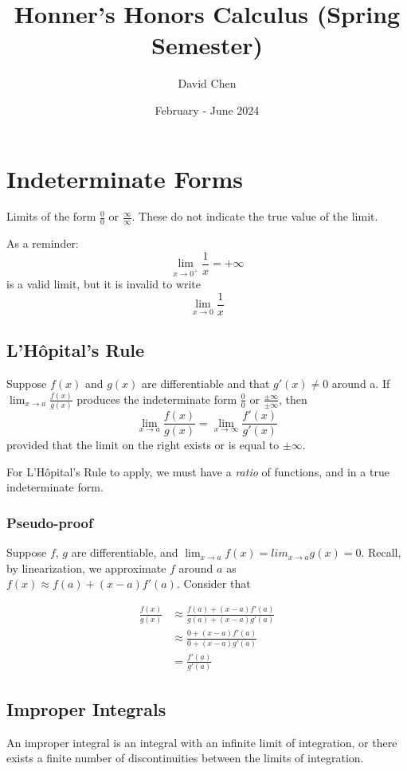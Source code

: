 \documentclass{article}
\title{Honner's Honors Calculus (Spring Semester)}
\author{David Chen}
\date{February - June 2024}
\begin{document}
\maketitle

\section{Indeterminate Forms}
Limits of the form $\frac{0}{0}$ or $\frac{\infty}{\infty}$. These do not indicate the true value of the limit.

As a reminder:
$$\lim_{x \to 0^+} \frac{1}{x} = + \infty$$
is a valid limit, but it is invalid to write $$\lim_{x \to 0} \frac{1}{x}$$

\subsection{L'Hôpital's Rule}
Suppose $f(x)$ and $g(x)$ are differentiable and that $g'(x) \ne 0$ around a. If $\lim_{x\to a} \frac{f(x)}{g(x)}$ produces the indeterminate form $\frac{0}{0}$ or $\frac{\pm \infty}{\pm \infty}$, then $$\lim_{x \to a} \frac{f(x)}{g(x)} = \lim_{x \to \infty} \frac{f'(x)}{g'(x)}$$ provided that the limit on the right exists or is equal to $\pm \infty$.

For L'Hôpital's Rule to apply, we must have a \emph{ratio} of functions, and in a true indeterminate form.

\subsubsection{Pseudo-proof}
Suppose $f$, $g$ are differentiable, and $\lim_{x \to a} f(x) = lim_{x \to a} g(x) = 0$. Recall, by linearization, we approximate $f$ around $a$ as $f(x) \approx f(a) + (x-a)f'(a)$. Consider that                                                                                              

\begin{align*}
   \frac{f(x)}{g(x)} & \approx \frac{f(a) + (x-a)f'(a)}{g(a) + (x-a)g'(a)} \\
                     & \approx \frac{0 + (x-a)f'(a)}{0 + (x-a)g'(a)} \\
                     &       = \frac{f'(a)}{g'(a)}
\end{align*}

\subsection{Improper Integrals}
An improper integral is an integral with an infinite limit of integration, or there exists a finite number of discontinuities between the limits of integration.
\end{document}

